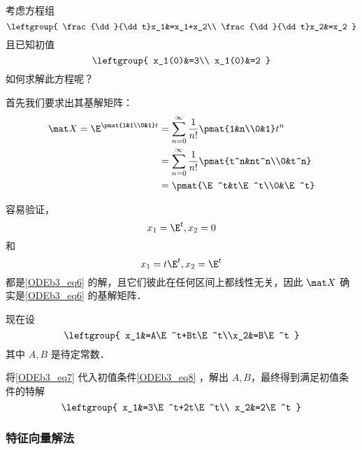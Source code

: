 \begin{example}{}
考虑方程组
\begin{equation}\label{ODEb3_eq6}
\leftgroup{
    \frac{\dd}{\dd t}x_1&=x_1+x_2\\
    \frac{\dd}{\dd t}x_2&=x_2
}
\end{equation}
且已知初值
\begin{equation}\label{ODEb3_eq8}
\leftgroup{
    x_1(0)&=3\\
    x_1(0)&=2
}
\end{equation}
如何求解此方程呢？

首先我们要求出其基解矩阵：
\begin{equation}
\begin{aligned}
\mat X=\E^{\pmat{1&1\\0&1}t}&=\sum_{n=0}^\infty\frac{1}{n!}\pmat{1&n\\0&1}t^n\\
&=\sum_{n=0}^\infty\frac{1}{n!}\pmat{t^n&nt^n\\0&t^n}\\
&=\pmat{\E^t&t\E^t\\0&\E^t}
\end{aligned}
\end{equation}

容易验证，
\begin{equation}
x_1=\E^t, x_2=0
\end{equation}
和
\begin{equation}
x_1=t\E^t, x_2=\E^t
\end{equation}
都是\autoref{ODEb3_eq6} 的解，且它们彼此在任何区间上都线性无关，因此 $\mat X$ 确实是\autoref{ODEb3_eq6} 的基解矩阵．

现在设
\begin{equation}\label{ODEb3_eq7}
\leftgroup{
x_1&=A\E^t+Bt\E^t\\x_2&=B\E^t
}
\end{equation}
其中 $A, B$ 是待定常数．

将\autoref{ODEb3_eq7} 代入初值条件\autoref{ODEb3_eq8} ，解出 $A, B$，最终得到满足初值条件的特解
\begin{equation}
\leftgroup{
    x_1&=3\E^t+2t\E^t\\
    x_2&=2\E^t
}
\end{equation}


\end{example}

\subsubsection{特征向量解法}

